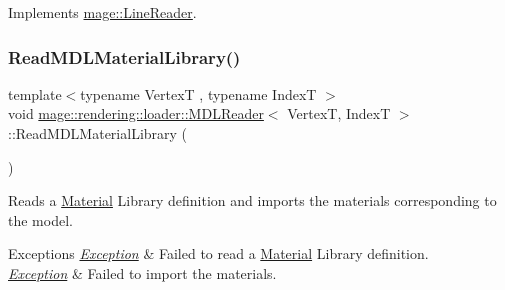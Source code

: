 Implements \hyperlink{classmage_1_1_line_reader_ae50ac0637eddead37a7a9cca2a570072}{mage\+::\+Line\+Reader}.

\hypertarget{classmage_1_1rendering_1_1loader_1_1_m_d_l_reader_a40697c5c645e00ba6f4cc5cd28872b8f}{}\label{classmage_1_1rendering_1_1loader_1_1_m_d_l_reader_a40697c5c645e00ba6f4cc5cd28872b8f} 
\subsubsection{\texorpdfstring{Read\+M\+D\+L\+Material\+Library()}{ReadMDLMaterialLibrary()}}
{\footnotesize\ttfamily template$<$typename VertexT , typename IndexT $>$ \\
void \hyperlink{classmage_1_1rendering_1_1loader_1_1_m_d_l_reader}{mage\+::rendering\+::loader\+::\+M\+D\+L\+Reader}$<$ VertexT, IndexT $>$\+::Read\+M\+D\+L\+Material\+Library (\begin{DoxyParamCaption}{ }\end{DoxyParamCaption})\hspace{0.3cm}{\ttfamily [private]}}

Reads a \hyperlink{classmage_1_1rendering_1_1_material}{Material} Library definition and imports the materials corresponding to the model.


\begin{DoxyExceptions}{Exceptions}
{\em \hyperlink{classmage_1_1_exception}{Exception}} & Failed to read a \hyperlink{classmage_1_1rendering_1_1_material}{Material} Library definition. \\
\hline
{\em \hyperlink{classmage_1_1_exception}{Exception}} & Failed to import the materials. \\
\hline
\end{DoxyExceptions}
\hypertarget{classmage_1_1rendering_1_1loader_1_1_m_d_l_reader_afe15d41185ac5f4de6607561d7068d8c}{}\label{classmage_1_1rendering_1_1loader_1_1_m_d_l_reader_afe15d41185ac5f4de6607561d7068d8c} 
